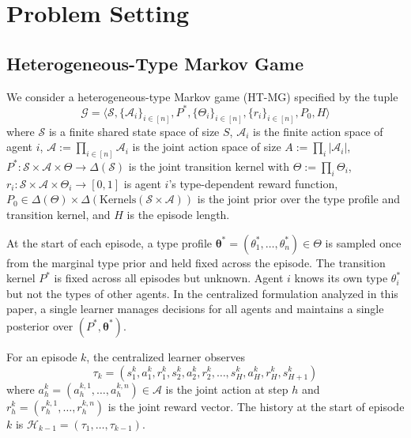 \documentclass{article}
\begin{document}
\section{Problem Setting}
\label{sec:setting}

\subsection{Heterogeneous-Type Markov Game}

We consider a heterogeneous-type Markov game (HT-MG) specified by the tuple
\begin{equation}
\mathcal{G} = \langle \mathcal{S}, \{\mathcal{A}_i\}_{i \in [n]}, P^*, \{\Theta_i\}_{i \in [n]}, \{r_i\}_{i \in [n]}, P_0, H \rangle
\end{equation}
where $\mathcal{S}$ is a finite shared state space of size $S$, $\mathcal{A}_i$ is the finite action space of agent $i$, $\mathcal{A} := \prod_{i \in [n]} \mathcal{A}_i$ is the joint action space of size $A := \prod_i |\mathcal{A}_i|$, $P^* : \mathcal{S} \times \mathcal{A} \times \Theta \to \Delta(\mathcal{S})$ is the joint transition kernel with $\Theta := \prod_i \Theta_i$, $r_i : \mathcal{S} \times \mathcal{A} \times \Theta_i \to [0,1]$ is agent $i$'s type-dependent reward function, $P_0 \in \Delta(\Theta) \times \Delta(\mathrm{Kernels}(\mathcal{S} \times \mathcal{A}))$ is the joint prior over the type profile and transition kernel, and $H$ is the episode length.

At the start of each episode, a type profile $\boldsymbol{\theta}^* = (\theta_1^*, \ldots, \theta_n^*) \in \Theta$ is sampled once from the marginal type prior and held fixed across the episode. The transition kernel $P^*$ is fixed across all episodes but unknown. Agent $i$ knows its own type $\theta_i^*$ but not the types of other agents. In the centralized formulation analyzed in this paper, a single learner manages decisions for all agents and maintains a single posterior over $(P^*, \boldsymbol{\theta}^*)$.

For an episode $k$, the centralized learner observes
\begin{equation}
\tau_k = (s_1^k, a_1^k, r_1^k, s_2^k, a_2^k, r_2^k, \ldots, s_H^k, a_H^k, r_H^k, s_{H+1}^k)
\end{equation}
where $a_h^k = (a_h^{k,1}, \ldots, a_h^{k,n}) \in \mathcal{A}$ is the joint action at step $h$ and $r_h^k = (r_h^{k,1}, \ldots, r_h^{k,n})$ is the joint reward vector. The history at the start of episode $k$ is $\mathcal{H}_{k-1} = (\tau_1, \ldots, \tau_{k-1})$.
\end{document}
